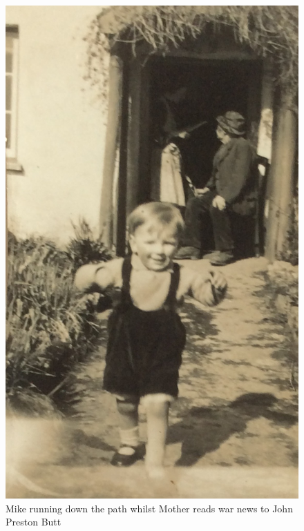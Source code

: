 \begin{figure}
  \centering
  \includegraphics[width=.9\linewidth]{pictures/cropped/Mike running down the path whilst Mother is reading War news to John Preston Butt.jpg}
  \caption*{Mike running down the path whilst Mother reads war news to John Preston Butt}
\end{figure}

